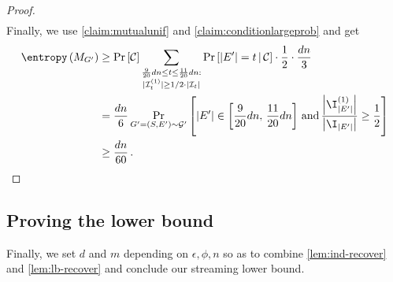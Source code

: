 \begin{proof}
\begin{align*}
		\end{align*}
		Finally, we use \cref{claim:mutualunif} and  \cref{claim:conditionlargeprob} and get
		\begin{align*}
			 	\entropy\left(M_{G'}\right) & \ge \Pr\left[  \mathcal{C} \right]     \sum_{\substack{\frac{9}{20}dn \le t \le  \frac{11}{20}dn:\\ |\mathcal{I}^{(1)}_{t}| \ge {1}/{2} \cdot |\mathcal{I}_t| } } \Pr\left[|E'|=t \, \middle| \, \mathcal{C} \right] \cdot \frac{1}{2} \cdot  \frac{dn}{3}  \\
			 	& =  \frac{dn}{6} \Pr_{G'=(S,E') \sim \mathcal{G}'}\left[  |E'| \in \left[\frac{9}{20}dn , \, \frac{11}{20}dn\right]  \, \mathrm{ and } \, \frac{\left|\I_{|E'|}^{(1)}\right|}{\left|\I_{|E'| }\right|} \ge  \frac{1}{2}\right] \\
			 	& \ge  \frac{dn}{60} \, .
	\end{align*}
\end{proof}

\subsection{Proving  the lower bound}
\label{subsec:lbproof}
Finally, we set $d$ and $m$ depending on $\epsilon,\phi,n$ so as to combine \cref{lem:ind-recover} and \cref{lem:lb-recover} and conclude our streaming lower bound.
\lb*

